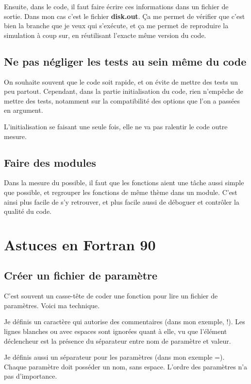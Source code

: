 Ensuite, dans le code, il faut faire écrire ces informations dans un fichier de sortie. Dans mon cas c'est le fichier \textbf{disk.out}. Ça me permet de vérifier que c'est bien la branche que je veux qui s'exécute, et ça me permet de reproduire la simulation à coup sur, en réutilisant l'exacte même version du code. 

\subsection{Ne pas négliger les tests au sein même du code}
On souhaite souvent que le code soit rapide, et on évite de mettre des tests un peu partout. Cependant, dans la partie initialisation du code, rien n'empêche de mettre des tests, notamment sur la compatibilité des options que l'on a passées en argument. 

L'initialisation se faisant une seule fois, elle ne va pas ralentir le code outre mesure.

\subsection{Faire des modules}
Dans la mesure du possible, il faut que les fonctions aient une tâche aussi simple que possible, et regrouper les fonctions de même thème dans un module. C'est ainsi plus facile de s'y retrouver, et plus facile aussi de déboguer et contrôler la qualité du code. 

\section{Astuces en Fortran 90}

\subsection{Créer un fichier de paramètre}
C'est souvent un casse-tête de coder une fonction pour lire un fichier de paramètres. Voici ma technique. 

Je définis un caractère qui autorise des commentaires (dans mon exemple, \og !\fg). Les lignes blanches ou avec espaces sont ignorées quant à elle, vu que l'élément déclencheur est la présence du séparateur entre nom de paramètre et valeur. 

Je définis aussi un séparateur pour les paramètres (dans mon exemple \og =\fg). Chaque paramètre doit posséder un nom, sans
espace. L'ordre des paramètres n'a pas d'importance. 

